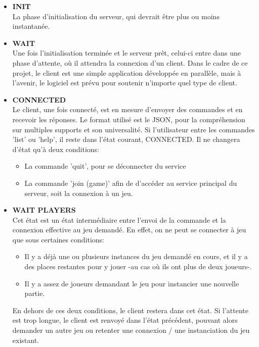 \begin{itemize}
	\item \textbf{INIT}\\
	La phase d'initialisation du serveur, qui devrait être plus ou moins instantanée.
	\vspace{1em}
	
	
	\item \textbf{WAIT}\\
	Une fois l'initialisation terminée et le serveur prêt, celui-ci entre dans une phase d'attente, où il attendra la connexion d'un client. Dans le cadre de ce projet, le client est une simple application développée en parallèle, mais à l'avenir, le logiciel est prévu pour soutenir n'importe quel type de client.
	\newpage
	
	
	\item \textbf{CONNECTED}\\
	Le client, une fois connecté, est en mesure d'envoyer des commandes et en recevoir les réponses. Le format utilisé est le JSON, pour la compréhension sur multiples supports et son universalité.
	Si l'utilisateur entre les commandes 'list' ou 'help', il reste dans l'état courant, CONNECTED. Il ne changera d'état qu'à deux conditions:
	
	\begin{itemize}
		\item La commande 'quit', pour se déconnecter du service
		\item La commande 'join (game)' afin de d'accéder au service principal du serveur, soit la connexion à un jeu.
	\end{itemize}
	\vspace{1em}
	
	
	\item \textbf{WAIT PLAYERS}\\
	Cet état est un état intermédiaire entre l'envoi de la commande et la connexion effective au jeu demandé. En effet, on ne peut se connecter à jeu que sous certaines conditions:
	\begin{itemize}
		\item Il y a déjà une ou plusieurs instances du jeu demandé en cours, et il y a des places restantes pour y jouer -au cas où ils ont plus de deux joueurs-.
		\item Il y a assez de joueurs demandant le jeu pour instancier une nouvelle partie.
	\end{itemize}
	\vspace{1em}
	
	En dehors de ces deux conditions, le client restera dans cet état. Si l'attente est trop longue, le client est renvoyé dans l'état précédent, pouvant alors demander un autre jeu ou retenter une connexion / une instanciation du jeu existant.
	\vspace{1em}
	

\end{itemize}

